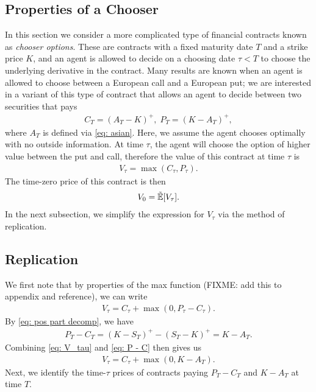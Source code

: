 \documentclass[reqno]{amsart}
\begin{document}
\subsection{Properties of a Chooser}
In this section we consider a more complicated type of financial contracts known as \emph{chooser options}. 
These are contracts with a fixed maturity date $T$ and a strike price $K$, and an agent is allowed to decide on a choosing date $\tau < T$ to choose the underlying derivative in the contract.
Many results are known when an agent is allowed to choose between a European call and a European put; we are interested in a variant of this type of contract that allows an agent to decide between two securities that pays 
\begin{align}
     C_T = (A_T - K)^+, \; P_T = (K - A_T)^+,
\end{align}
where $A_T$ is defined via \eqref{eq: asian}.
Here, we assume the agent chooses optimally with no outside information. At time $\tau$, the agent will choose the option of higher value between the put and call, therefore the value of this contract at time $\tau$ is 
\begin{align}\label{eq: V_tau}
     V_\tau = \max(C_\tau, P_\tau).
\end{align}
The time-zero price of this contract is then 
\begin{align}
      V_0 = \tilde{\mathbb{E}}[V_\tau].
\end{align}
In the next subsection, we simplify the expression for $V_\tau$ via the method of replication. 
\subsection{Replication}
We first note that by properties of the max function (FIXME: add this to appendix and reference), we can write 
\begin{align}\label{eq: chooser formula PC}
     V_\tau = C_\tau + \max(0, P_\tau - C_\tau).
\end{align}
By \eqref{eq: pos part decomp}, we have
\begin{align}\label{eq: P - C}
     P_T - C_T = (K-S_T)^+ - (S_T - K)^+ = K - A_T. 
\end{align}
Combining \eqref{eq: V_tau} and \eqref{eq: P - C} then gives us 
\begin{align}
      V_\tau = C_\tau + \max(0, K - A_T).
\end{align}
Next, we identify the time-$\tau$ prices of contracts paying $P_T - C_T$ and $K - A_T$ at time $T$.
\end{document}
